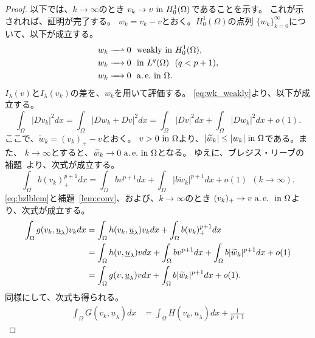 \begin{proof}
 以下では、$k \to \infty$のとき
 $v_k \to v ~\tin H_0^1(\Omega)$であることを示す。
 これが示されれば、証明が完了する。
 $w_k = v_k - v$とおく。$H_0^1(\Omega)$の点列
 $\{ w_k \}_{k=0}^\infty$について、以下が成立する。
 \begin{align}
  w_k \xrightharpoonup{ \mbox{ ~ } } 0 & \ \ \text{weakly~} \tin
  H_0^1(\Omega), \label{eq:wk_weakly} \\
  w_k \xrightarrow{ \mbox{ ~ } } 0 & \ \ \tin L^q(\Omega) \ \
  (q < p+1), \label{eq:wk_Lq} \\
  w_k \xrightarrow{ \mbox{ ~ } } 0 & \ \ \ae \tin \Omega. 
  \label{eq:wk_ae}
 \end{align}
 $I_\lambda(v)$と$I_\lambda(v_k)$の差を、$w_k$を用いて評価する。
 \eqref{eq:wk_weakly}より、以下が成立する。
 \begin{equation}
  \int_\Omega \lvert D v_k \rvert^2 dx = \int_\Omega \lvert Dw_k + Dv
   \rvert^2 dx = \int_\Omega \lvert Dv \rvert^2 dx + \int_\Omega \lvert
   Dw_k \rvert^2 dx + o(1). \label{eq:Dvk_Dwk}
 \end{equation}
 ここで、$\tilde{w}_k = (v_k)_+ - v$とおく。
 $v > 0 ~\tin \Omega$より、$\lvert \tilde{w}_k \rvert \leq \lvert w_k
 \rvert ~\tin \Omega$である。また、
 $k \to \infty$とすると、$\tilde{w}_k \to 0 ~\ae \tin \Omega$となる。
 ゆえに、ブレジス・リーブの補題~\cite{MR699419}より、次式が成立する。
 \begin{equation}
  \int_\Omega b(v_k)_{+}^{p+1} dx = \int_\Omega bv^{p+1} dx +
   \int_\Omega \lvert b\tilde{w}_k \rvert^{p+1} dx + o(1) \ \ (k \to
   \infty).
   \label{eq:bzlblem}
 \end{equation}
 \eqref{eq:bzlblem}と補題~\ref{lem:conv}、および、$k \to \infty$のとき
 $(v_k)_+ \to v ~\ae ~\tin \Omega$より、次式が成立する。
 \begin{align}
  \int_\Omega g(v_k, \underline{u}_\lambda) v_k dx &= \int_\Omega
  h(v_k, \underline{u}_\lambda) v_k dx + \int_\Omega b (v_k)_+^{p+1}
  dx \notag \\
  &= \int_\Omega
  h(v, \underline{u}_\lambda) v dx + \int_\Omega b v^{p+1}
  dx + \int_\Omega b \lvert \tilde{w}_k \lvert^{p+1} dx + o(1) \notag \\
  &= \int_\Omega g(v, \underline{u}_\lambda) v dx + 
  \int_\Omega b \lvert \tilde{w}_k \lvert^{p+1} dx + o(1). \label{eq:w_k_1}
 \end{align}
 同様にして、次式も得られる。
 \begin{align}
  \int_\Omega G(v_k, \underline{u}_\lambda) dx &= 
  \int_\Omega H(v_k, \underline{u}_\lambda) dx + \frac{1}{p+1}

\end{align}
\end{proof}
